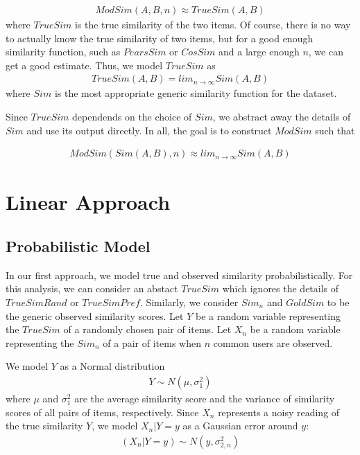 \documentclass[11pt]{article}
\begin{document}
\begin{align}
ModSim(A, B, n) \approx TrueSim(A, B)
\end{align}
where $TrueSim$ is the true similarity of the two items. Of course, there is no
way to actually know the true similarity of two items, but for a good enough
similarity function, such as $PearsSim$ or $CosSim$ and a large enough $n$, we
can get a good estimate. Thus, we model $TrueSim$ as 
\begin{align}
TrueSim(A, B) = lim_{n\to\infty}Sim(A, B)
\end{align}
where $Sim$ is the most appropriate generic similarity function for the dataset.

Since $TrueSim$ dependends on the choice of $Sim$, we abstract away the details
of $Sim$ and use its output directly. In all, the goal is to construct $ModSim$
such that

\begin{align}
ModSim(Sim(A, B), n) \approx lim_{n\to\infty}Sim(A, B)
\end{align}

\section*{Linear Approach}
\subsection*{Probabilistic Model}

In our first approach, we model true and observed similarity probabilistically. For
this analysis, we can consider an abstact $TrueSim$ which ignores the details of 
$TrueSimRand$ or $TrueSimPref$. Similarly, we consider $Sim_{n}$ and $GoldSim$ to be
the generic observed similarity scores. Let $Y$ be a random variable representing 
the $TrueSim$ of a randomly chosen pair of items. Let $X_{n}$ be a random variable 
representing the $Sim_{n}$ of a pair of items when $n$ common users are observed.

We model $Y$ as a Normal distribution 
\begin{align}
Y \sim N(\mu, \sigma_{1}^2)
\end{align}
where $\mu$ and $\sigma_{1}^2$ are the average similarity score and the variance 
of similarity scores of all pairs of items, respectively. Since $X_n$ represents
a noisy reading of the true similarity $Y$, we model $X_n | Y=y$ as a Gaussian
error around $y$:
\begin{align}
(X_n | Y=y) \sim N(y, \sigma_{2, n}^2)
\end{align}
\end{document}
